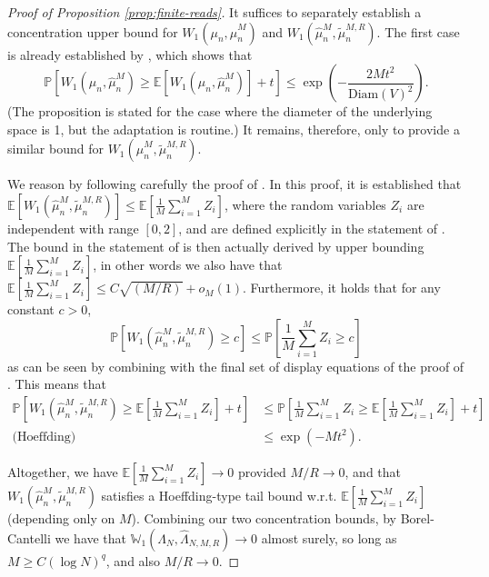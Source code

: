 \documentclass[aos, preprint]{imsart}
\theoremstyle{plain}
\theoremstyle{remark}
\begin{document}
\begin{appendix}
\begin{proof}[Proof of Proposition \ref{prop:finite-reads}]
It suffices to separately establish a concentration upper bound for $W_{1}(\mu_{n},\hat{\mu}_{n}^{M})$ and $W_{1}(\hat{\mu}_{n}^{M},\tilde{\mu}_{n}^{M,R})$. The first case is already established by \cite[Proposition 20]{weed2019sharp}, which shows that
\[
\mathbb{P}\left[W_{1}(\mu_{n},\hat{\mu}_{n}^{M})\geq \mathbb{E}[W_{1}(\mu_{n},\hat{\mu}_{n}^{M})]+t\right]\leq \exp \left(-\frac{2Mt^2}{\textrm{Diam}(V)^2}\right).
\]
(The proposition is stated for the case where the diameter of the underlying space is 1, but the adaptation is routine.)
It remains, therefore, only to provide a similar bound for $W_{1}(\hat{\mu}_{n}^{M},\tilde{\mu}_{n}^{M,R})$.

We reason by following carefully the proof of \cite[Theorem 2.4]{kim2024optimal}. In this proof, it is established that $\mathbb{E}[W_{1}(\hat{\mu}_{n}^{M},\tilde{\mu}_{n}^{M,R})]\leq \mathbb{E}\left[\frac{1}{M}\sum_{i=1}^MZ_i\right]$, where the random variables $Z_i$ are independent with range $[0,2]$, and are defined explicitly in the statement of \cite[Lemma 4.4]{kim2024optimal}. The bound in the statement of \cite[Theorem 2.4]{kim2024optimal} is then actually derived by upper bounding $\mathbb{E}\left[\frac{1}{M}\sum_{i=1}^MZ_i\right]$, in other words we also have that $\mathbb{E}\left[\frac{1}{M}\sum_{i=1}^MZ_i\right]\leq C \sqrt{(M/R)}+o_M(1)$. Furthermore, it holds that for any constant $c>0$,
\[
\mathbb{P}\left[W_{1}(\hat{\mu}_{n}^{M},\tilde{\mu}_{n}^{M,R})\geq c\right]\leq \mathbb{P}\left[\frac{1}{M}\sum_{i=1}^MZ_i \geq c\right]
\]
as can be seen by combining \cite[equation (4.1)]{kim2024optimal} with the final set of display equations of the proof of \cite[Theorem 2.4]{kim2024optimal}. This means that
\begin{align*}
\mathbb{P}\left[W_{1}(\hat{\mu}_{n}^{M},\tilde{\mu}_{n}^{M,R})\geq\mathbb{E}\left[\frac{1}{M}\sum_{i=1}^{M}Z_{i}\right]+t\right] & \leq\mathbb{P}\left[\frac{1}{M}\sum_{i=1}^{M}Z_{i}\geq\mathbb{E}\left[\frac{1}{M}\sum_{i=1}^{M}Z_{i}\right]+t\right]\\
\text{(Hoeffding)} & \leq\exp\left(-Mt^{2}\right).
\end{align*}

Altogether, we have $\mathbb{E}\left[\frac{1}{M}\sum_{i=1}^{M}Z_{i}\right]\rightarrow 0$ provided $M/R \rightarrow 0$, and that $W_{1}(\hat{\mu}_{n}^{M},\tilde{\mu}_{n}^{M,R})$ satisfies a Hoeffding-type tail bound w.r.t. $\mathbb{E}\left[\frac{1}{M}\sum_{i=1}^{M}Z_{i}\right]$ (depending only on $M$). Combining our two concentration bounds, by Borel-Cantelli we have that $\mathbb{W}_1(\Lambda_N,\hat{\Lambda}_{N,M,R})\rightarrow0$ almost surely, so long as $M\geq C(\log N)^q$, and also $M/R \rightarrow 0$.


\end{proof}
\end{appendix}
\end{document}
